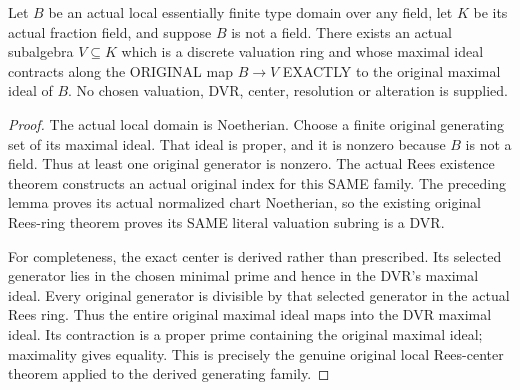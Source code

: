 \begin{theorem}
\label{algebra:actual-essentially-finite-type-centered-dvr-exists}
\leanok
{}
Let $B$ be an actual local essentially finite type domain over any field,
let $K$ be its actual fraction field, and suppose $B$ is not a field.
There exists an actual subalgebra $V\subseteq K$ which is a discrete valuation
ring and whose maximal ideal contracts along the ORIGINAL map $B\to V$
EXACTLY to the original maximal ideal of $B$. No chosen valuation, DVR,
center, resolution or alteration is supplied.
\end{theorem}
\begin{proof}
The actual local domain is Noetherian. Choose a finite original generating set
of its maximal ideal. That ideal is proper, and it is nonzero because $B$ is
not a field. Thus at least one original generator is nonzero. The actual Rees
existence theorem constructs an actual original index for this SAME family.
The preceding lemma proves its actual normalized chart Noetherian, so the
existing original Rees-ring theorem proves its SAME literal valuation subring
is a DVR.

For completeness, the exact center is derived rather than prescribed. Its
selected generator lies in the chosen minimal prime and hence in the DVR's
maximal ideal. Every original generator is divisible by that selected generator
in the actual Rees ring. Thus the entire original maximal ideal maps into the
DVR maximal ideal. Its contraction is a proper prime containing the original
maximal ideal; maximality gives equality. This is precisely the genuine
original local Rees-center theorem applied to the derived generating family.
\end{proof}
